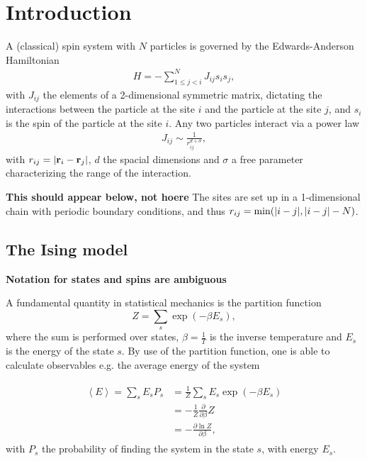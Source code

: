 \section{Introduction}
A (classical) spin system with $N$ particles is governed by the Edwards-Anderson Hamiltonian 
\begin{align}
	H = -\sum^N_{1\le j < i} J_{ij} s_i s_j,
	\label{eq:connected-Hamiltonian}
\end{align}
with $J_{ij}$ the elements of a 2-dimensional symmetric matrix, dictating the interactions between the particle at the site $i$ and the particle at the site $j$, and $s_i$ is the spin of the particle at the site $i$.
Any two particles interact via a power law
\begin{align}
	J_{ij} \sim \frac{1}{r^{d+\sigma}_{ij}},
\end{align}
with $r_{ij} = \lvert \textbf{r}_i - \textbf{r}_j \rvert$, $d$ the spacial dimensions and $\sigma$ a free parameter characterizing the range of the interaction. 

\textbf{This should appear below, not hoere} The sites are set up in a 1-dimensional chain with periodic boundary conditions, and thus $r_{ij}  = \min( \lvert i - j \rvert, \lvert i-j \rvert - N )$.

\subsection{The Ising model}

\textbf{Notation for states and spins are ambiguous}

A fundamental quantity in statistical mechanics is the partition function \[
	Z = \sum_s \exp (-\beta E_s),
\]
where the sum is performed over states, $\beta =  \frac{1}{T}$ is the inverse temperature and $E_s$ is the energy of the state $s$. By use of the partition function, one is able to calculate observables e.g. the average energy of the system 

\begin{align}
	\begin{split}
	\left< E\right> = 	\sum_s E_s P_s &=  \frac{1}{Z}\sum_s E_s \exp{(-\beta E_s)} \\
									   &= - \frac{1}{Z} \frac{\partial }{\partial \beta } Z \\
									   &= - \frac{\partial \ln Z}{\partial \beta},
	\end{split}
\end{align}
with $P_s$ the probability of finding the system in the state $s$, with energy $E_s$.

